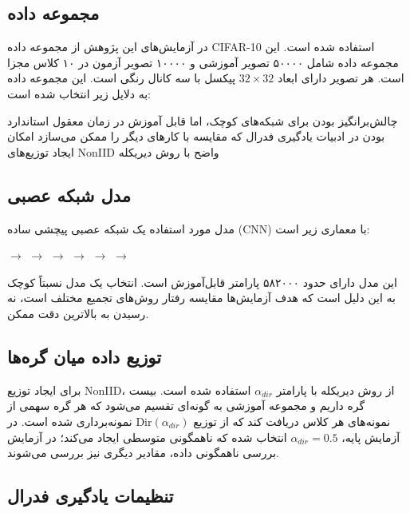 \subsection{مجموعه داده}

در آزمایش‌های این پژوهش از مجموعه داده \gls{CIFAR}-10 استفاده شده است. این مجموعه داده شامل ۵۰۰۰۰ تصویر آموزشی و ۱۰۰۰۰ تصویر آزمون در ۱۰ کلاس مجزا است. هر تصویر دارای ابعاد $32 \times 32$ پیکسل با سه کانال رنگی است. این مجموعه داده به دلایل زیر انتخاب شده است:

\begin{itemize}
    \tick چالش‌برانگیز بودن برای شبکه‌های کوچک، اما قابل آموزش در زمان معقول
    \tick استاندارد بودن در ادبیات یادگیری فدرال که مقایسه با کارهای دیگر را ممکن می‌سازد
    \tick امکان ایجاد توزیع‌های \gls{NonIID} واضح با روش دیریکله
\end{itemize}

\subsection{مدل شبکه عصبی}

مدل مورد استفاده یک شبکه عصبی پیچشی ساده (\gls{CNN}) با معماری زیر است:

\begin{itemize}
    \tick {} $\to$ 
    \tick {} $\to$  $\to$ 
    \tick {} $\to$  $\to$ 
    \tick {} $\to$ 
    \tick {}
\end{itemize}

این مدل دارای حدود ۵۸۲۰۰۰ پارامتر قابل‌آموزش است. انتخاب یک مدل نسبتاً کوچک به این دلیل است که هدف آزمایش‌ها مقایسه رفتار روش‌های تجمیع مختلف است، نه رسیدن به بالاترین دقت ممکن.

\subsection{توزیع داده میان گره‌ها}

برای ایجاد توزیع \gls{NonIID}، از روش دیریکله با پارامتر $\alpha_{dir}$ استفاده شده است. بیست گره داریم و مجموعه آموزشی به گونه‌ای تقسیم می‌شود که هر گره سهمی از نمونه‌های هر کلاس دریافت کند که از توزیع $\text{Dir}(\alpha_{dir})$ نمونه‌برداری شده است. در آزمایش پایه، $\alpha_{dir} = 0.5$ انتخاب شده که ناهمگونی متوسطی ایجاد می‌کند؛ در آزمایش بررسی ناهمگونی داده، مقادیر دیگری نیز بررسی می‌شوند.

\subsection{تنظیمات یادگیری فدرال}

